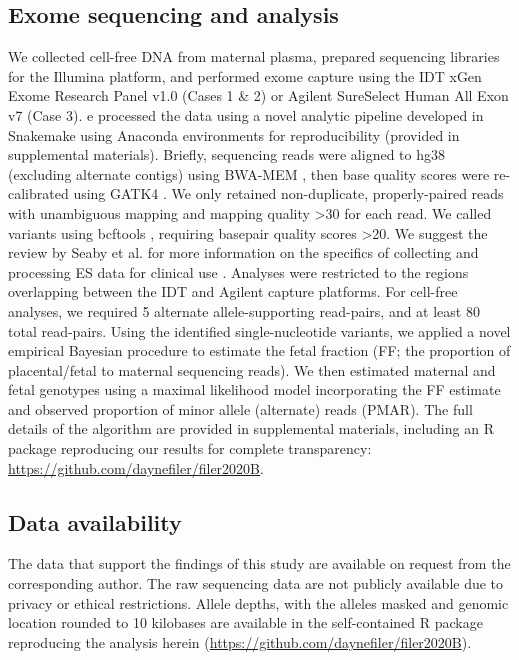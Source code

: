 \documentclass{article}\usepackage[]{graphicx}\usepackage[]{color}
\begin{document}
\subsection{Exome sequencing and analysis}
We collected cell-free DNA from maternal plasma, prepared sequencing libraries for the Illumina platform, and performed exome capture using the IDT xGen Exome Research Panel v1.0 (Cases 1 \& 2) or Agilent SureSelect Human All Exon v7 (Case 3).
e processed the data using a novel analytic pipeline developed in Snakemake \cite{koster:2012aa} using Anaconda environments for reproducibility (provided in supplemental materials).
Briefly, sequencing reads were aligned to hg38 (excluding alternate contigs) using BWA-MEM \cite{li:2013ab}, then base quality scores were re-calibrated using GATK4 \cite{mckenna:2010aa,van-der-auwera:2013aa,poplin:2018aa}.
We only retained non-duplicate, properly-paired reads with unambiguous mapping and mapping quality >30 for each read.
We called variants using bcftools \cite{li:2011aa}, requiring basepair quality scores >20.
We suggest the review by Seaby et al. for more information on the specifics of collecting and processing ES data for clinical use \cite{seaby:2016aa}.
Analyses were restricted to the regions overlapping between the IDT and Agilent capture platforms.
For cell-free analyses, we required 5 alternate allele-supporting read-pairs, and at least 80 total read-pairs.
Using the identified single-nucleotide variants, we applied a novel empirical Bayesian procedure to estimate the fetal fraction (FF; the proportion of placental/fetal to maternal sequencing reads).
We then estimated maternal and fetal genotypes using a maximal likelihood model incorporating the FF estimate and observed proportion of minor allele (alternate) reads (PMAR).
The full details of the algorithm are provided in supplemental materials, including an R \cite{r-core-team:2019aa} package reproducing our results for complete transparency: \url{https://github.com/daynefiler/filer2020B}.

\subsection{Data availability}
The data that support the findings of this study are available on request from the corresponding author.
The raw sequencing data are not publicly available due to privacy or ethical restrictions.
Allele depths, with the alleles masked and genomic location rounded to 10 kilobases are available in the self-contained R package reproducing the analysis herein (\url{https://github.com/daynefiler/filer2020B}).
\end{document}
